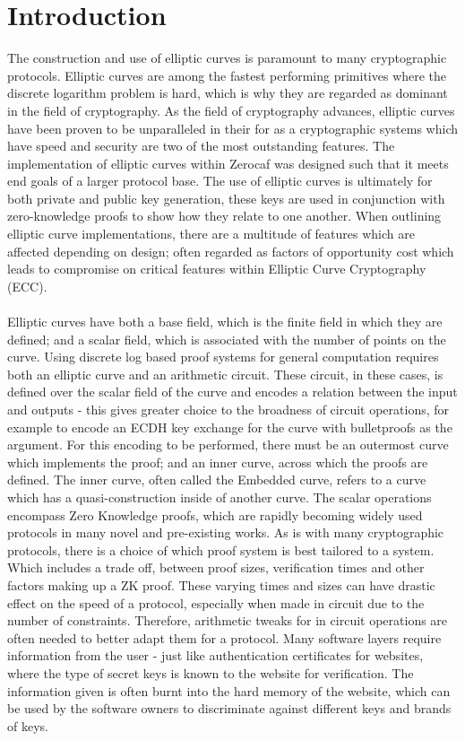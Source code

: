 \documentclass{article}
\begin{document}
\section{Introduction}
The construction and use of elliptic curves is paramount to many cryptographic protocols. Elliptic curves are among the fastest performing primitives where the discrete logarithm problem is hard, which is why they are regarded as dominant in the field of cryptography. As the field of cryptography advances, elliptic curves have been proven to be unparalleled in their for as a cryptographic systems which have speed and security are two of the most outstanding features. The implementation of elliptic curves within Zerocaf was designed such that it meets end goals of a larger protocol base. The use of elliptic curves is ultimately for both private and public key generation, these keys are used in conjunction with zero-knowledge proofs to show how they relate to one another. When outlining elliptic curve implementations, there are a multitude of features which are affected depending on design; often regarded as factors of opportunity cost which leads to compromise on critical features within Elliptic Curve Cryptography (ECC).\\\\
Elliptic curves have both a base field, which is the finite field in which they are defined; and a scalar field, which is associated with the number of points on the curve. Using discrete log based proof systems for general computation requires both an elliptic curve and an arithmetic circuit. These circuit, in these cases, is defined over the scalar field of the curve and encodes a relation between the input and outputs - this gives greater choice to the broadness of circuit operations, for example to encode an ECDH key exchange for the curve with bulletproofs as the argument. For this encoding to be performed, there must be an outermost curve which implements the proof; and an inner curve, across which the proofs are defined. The inner curve, often called the Embedded curve, refers to a curve which has a quasi-construction inside of another curve. The scalar operations encompass Zero Knowledge proofs, which are rapidly becoming widely used protocols in many novel and pre-existing works. As is with many cryptographic protocols, there is a choice of which proof system is best tailored to a system. Which includes a trade off, between proof sizes, verification times and other factors making up a ZK proof. These varying times and sizes can have drastic effect on the speed of a protocol, especially when made in circuit due to the number of constraints. Therefore, arithmetic tweaks for in circuit operations are often needed to better adapt them for a protocol. Many software layers require information from the user - just like authentication certificates for websites, where the type of secret keys is known to the website for verification. The information given is often burnt into the hard memory of the website, which can be used by the software owners to discriminate against different keys and brands of keys. \\\\
\end{document}
